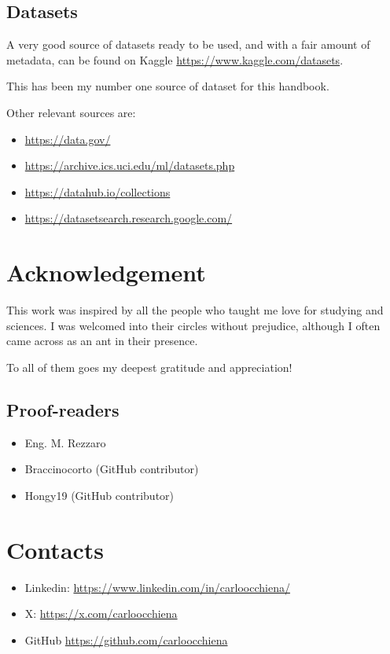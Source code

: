 \documentclass{article}
\begin{document}
\subsection{Datasets}
A very good source of datasets ready to be used, and with a fair amount of metadata, can be found on Kaggle \url{https://www.kaggle.com/datasets}. 

This has been my number one source of dataset for this handbook.

Other relevant sources are:
\begin{itemize}
    \item \url{ https://data.gov/ }
    \item \url{https://archive.ics.uci.edu/ml/datasets.php }
    \item \url{https://datahub.io/collections }
    \item \url{https://datasetsearch.research.google.com/ }
\end{itemize}

\section{Acknowledgement}
This work was inspired by all the people who taught me love for studying and sciences. I was welcomed into their circles without prejudice, although I often came across as an ant in their presence.

To all of them goes my deepest gratitude and appreciation! 

\subsection{Proof-readers}
\begin{itemize}
    \item Eng. M. Rezzaro
    \item Braccinocorto (GitHub contributor)
    \item Hongy19 (GitHub contributor)
\end{itemize}


\section{Contacts}
\begin{itemize}
    \item Linkedin: \url{https://www.linkedin.com/in/carloocchiena/} 
    \item X: \url{https://x.com/carloocchiena} 
    \item GitHub \url{https://github.com/carloocchiena}
\end{itemize}
\end{document}
